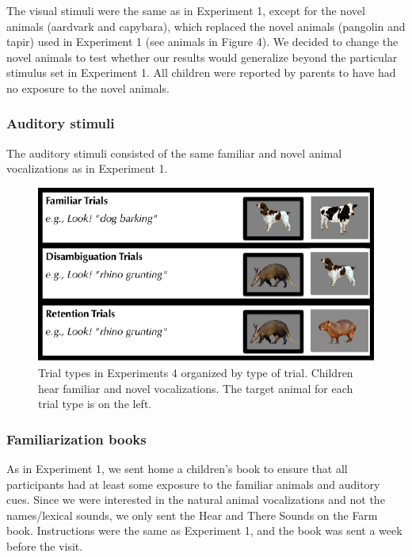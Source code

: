 \documentclass[english,floatsintext,man]{apa6}
\theoremstyle{definition}
\theoremstyle{definition}
\theoremstyle{definition}
\theoremstyle{remark}
\begin{document}
The visual stimuli were the same as in Experiment 1, except for the
novel animals (aardvark and capybara), which replaced the novel animals
(pangolin and tapir) used in Experiment 1 (see animals in Figure 4). We
decided to change the novel animals to test whether our results would
generalize beyond the particular stimulus set in Experiment 1. All
children were reported by parents to have had no exposure to the novel
animals.

\hypertarget{auditory-stimuli-1}{%
\subsubsection{Auditory stimuli}\label{auditory-stimuli-1}}

The auditory stimuli consisted of the same familiar and novel animal
vocalizations as in Experiment 1.

\begin{figure}[t]

{\centering \includegraphics[width=0.7\linewidth]{anime_manuscript_files/figure-latex/stimuli-e2-1} 

}

\caption{Trial types in Experiments 4 organized by type of trial. Children hear familiar and novel vocalizations. The target animal for each trial type is on the left.}\label{fig:stimuli-e2}
\end{figure}

\hypertarget{familiarization-books-1}{%
\subsubsection{Familiarization books}\label{familiarization-books-1}}

As in Experiment 1, we sent home a children's book to ensure that all
participants had at least some exposure to the familiar animals and
auditory cues. Since we were interested in the natural animal
vocalizations and not the names/lexical sounds, we only sent the Hear
and There Sounds on the Farm book. Instructions were the same as
Experiment 1, and the book was sent a week before the visit.
\end{document}
